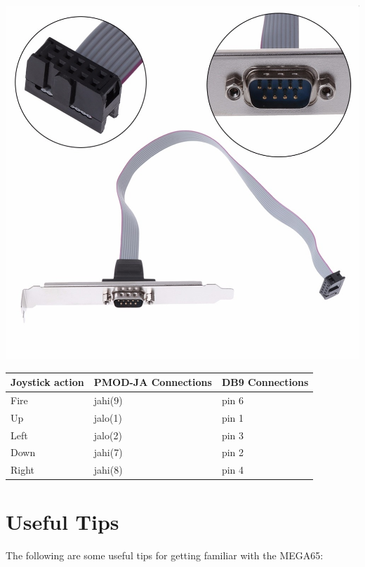   \begin{center}
    \includegraphics[width=0.9\linewidth]{images/joystick-pmod-thechief.png}
  \end{center}

\begin{minipage}{\linewidth}
\begin{center}
  \begin{longtable}{|L{3cm}|L{3cm}|p{3cm}|}
    \hline
    {\textbf{Joystick action}} & {\textbf{PMOD-JA Connections}} & {\textbf{DB9 Connections}} \\
    \hline
    {Fire} & {jahi(9)} & {pin 6} \\
    \hline
    {Up} & {jalo(1)} & {pin 1} \\
    \hline
    {Left} & {jalo(2)} & {pin 3} \\
    \hline
    {Down} & {jahi(7)} & {pin 2} \\
    \hline
    {Right} & {jahi(8)} & {pin 4} \\
    \hline
  \end{longtable}
\end{center}
\end{minipage}


\section{Useful Tips}

The following are some useful tips for getting familiar with the MEGA65:


